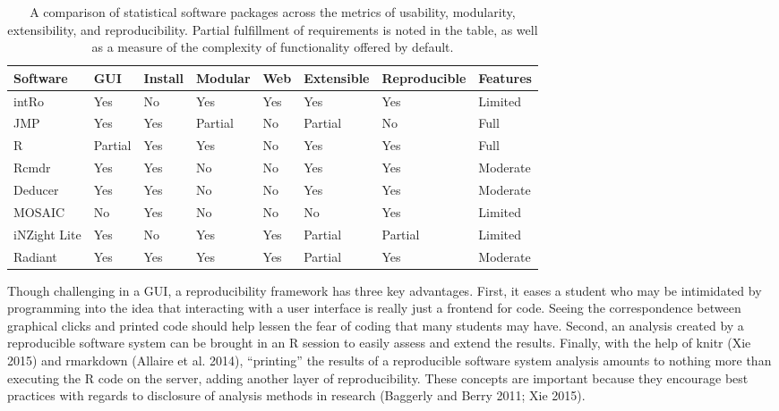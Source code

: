 \documentclass[12pt,]{article}
\begin{document}
\begin{table}[ht]
\centering
\begin{tabular}{llllllll}
  \hline
Software & GUI & Install & Modular & Web & Extensible & Reproducible & Features \\ 
  \hline
intRo & Yes & No & Yes & Yes & Yes & Yes & Limited \\ 
  JMP & Yes & Yes & Partial & No & Partial & No & Full \\ 
  R & Partial & Yes & Yes & No & Yes & Yes & Full \\ 
  Rcmdr & Yes & Yes & No & No & Yes & Yes & Moderate \\ 
  Deducer & Yes & Yes & No & No & Yes & Yes & Moderate \\ 
  MOSAIC & No & Yes & No & No & No & Yes & Limited \\ 
  iNZight Lite & Yes & No & Yes & Yes & Partial & Partial & Limited \\ 
  Radiant & Yes & Yes & Yes & Yes & Partial & Yes & Moderate \\ 
   \hline
\end{tabular}
\caption{A comparison of statistical software packages across the metrics of usability, modularity, extensibility, and reproducibility. Partial fulfillment of requirements is noted in the table, as well as a measure of the complexity of functionality offered by default.} 
\label{tab:compare}
\end{table}

Though challenging in a GUI, a reproducibility framework has three key
advantages. First, it eases a student who may be intimidated by
programming into the idea that interacting with a user interface is
really just a frontend for code. Seeing the correspondence between
graphical clicks and printed code should help lessen the fear of coding
that many students may have. Second, an analysis created by a
reproducible software system can be brought in an R session to easily
assess and extend the results. Finally, with the help of knitr (Xie
2015) and rmarkdown (Allaire et al. 2014), ``printing'' the results of a
reproducible software system analysis amounts to nothing more than
executing the R code on the server, adding another layer of
reproducibility. These concepts are important because they encourage
best practices with regards to disclosure of analysis methods in
research (Baggerly and Berry 2011; Xie 2015).
\end{document}
